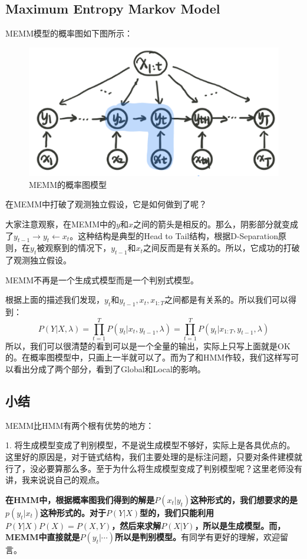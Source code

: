 \documentclass[a4paper]{article}
\begin{document}
\subsection{Maximum Entropy Markov Model}
MEMM模型的概率图如下图所示：
\begin{figure}[H]
    \centering
    \includegraphics[width=.5\textwidth]{微信图片_20200221213227.png}
    \caption{MEMM的概率图模型}
    \label{fig:my_label_1}
\end{figure}
在MEMM中打破了观测独立假设，它是如何做到了呢？

大家注意观察，在MEMM中的$y$和$x$之间的箭头是相反的。那么，阴影部分就变成了$y_{t-1} \rightarrow y_t \leftarrow x_{t}$。这种结构是典型的Head to Tail结构，根据D-Separation原则，在$y_t$被观察到的情况下，$y_{t-1}$和$x_{t}$之间反而是有关系的。所以，它成功的打破了观测独立假设。

MEMM不再是一个生成式模型而是一个判别式模型。

根据上面的描述我们发现，$y_t$和$y_{t-1},x_t,x_{1:T}$之间都是有关系的。所以我们可以得到：
\begin{equation}
    P(Y|X,\lambda) = \prod_{t=1}^T P(y_t|x_t,y_{t-1},\lambda) = \prod_{t=1}^T P(y_t|x_{1:T},y_{t-1},\lambda)
\end{equation}
所以，我们可以很清楚的看到可以是一个全量的输出，实际上只写上面就是OK的。在概率图模型中，只画上一半就可以了。而为了和HMM作较，我们这样写可以看出分成了两个部分，看到了Global和Local的影响。

\subsection{小结}
MEMM比HMM有两个根有优势的地方：

1. 将生成模型变成了判别模型，不是说生成模型不够好，实际上是各具优点的。这里好的原因是，对于链式结构，我们主要处理的是标注问题，只要对条件建模就行了，没必要算那么多。至于为什么将生成模型变成了判别模型呢？这里老师没有讲，我来说说自己的观点。

\textbf{在HMM中，根据概率图我们得到的解是$P(x_t|y_t)$这种形式的，我们想要求的是$p(y_t|x_t)$这种形式的。对于$P(Y|X)$型的，我们只能利用$P(Y|X)P(X) = P(X,Y)$，然后来求解$P(X|Y)$，所以是生成模型。而，MEMM中直接就是$P(y_t|\cdots)$所以是判别模型。}有同学有更好的理解，欢迎留言。
\end{document}
